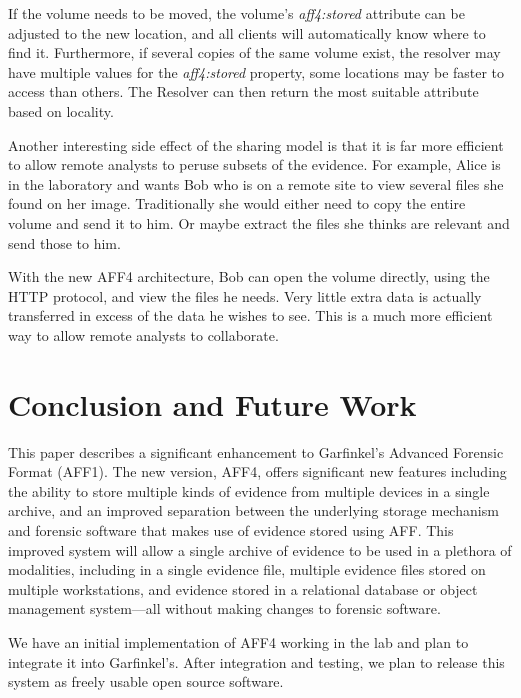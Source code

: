 \documentclass[10pt, conference]{IEEEtran}
\begin{document}
If the volume needs to be moved, the volume's \emph{aff4:stored}
attribute can be adjusted to the new location, and all clients will
automatically know where to find it. Furthermore, if several copies of
the same volume exist, the resolver may have multiple values for the
\emph{aff4:stored} property, some locations may be faster to access than
others. The Resolver can then return the most suitable attribute based
on locality.

Another interesting side effect of the sharing model is that it is far
more efficient to allow remote analysts to peruse subsets of the
evidence. For example, Alice is in the laboratory and wants Bob who is
on a remote site to view several files she found on her
image. Traditionally she would either need to copy the entire volume
and send it to him. Or maybe extract the files she thinks are relevant
and send those to him.

With the new AFF4 architecture, Bob can open the volume directly,
using the HTTP protocol, and view the files he needs. Very little
extra data is actually transferred in excess of the data he wishes to
see. This is a much more efficient way to allow remote analysts to
collaborate.

\section{Conclusion and Future Work}

This paper describes a significant enhancement to Garfinkel's Advanced
Forensic Format (AFF1). The new version, AFF4, offers significant new
features including the ability to store multiple kinds of evidence
from multiple devices in a single archive, and an improved separation
between the underlying storage mechanism and forensic software that
makes use of evidence stored using AFF. This improved system will
allow a single archive of evidence to be used in a plethora of
modalities, including in a single evidence file, multiple evidence
files stored on multiple workstations, and evidence stored in a
relational database or object management system---all without making
changes to forensic software.

We have an initial implementation of AFF4 working in the lab and plan
to integrate it into Garfinkel's. After integration and testing, we
plan to release this system as freely usable open source software.



\end{document}
